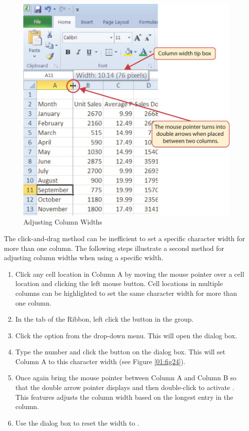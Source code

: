 \begin{figure}[H]
	\centering
	\includegraphics[width=\maxwidth{.95\linewidth}]{gfx/ch01_fig23}
	\caption{Adjusting Column Widths}
	\label{01:fig23}
\end{figure}

The click-and-drag method can be inefficient to set a specific character width for more than one column. The following steps illustrate a second method for adjusting column widths when using a specific width.

\begin{enumerate}
	\item Click any cell location in Column A by moving the mouse pointer over a cell location and clicking the left mouse button. Cell locations in multiple columns can be highlighted to set the same character width for more than one column.
	\item In the  tab of the Ribbon, left click the  button in the  group.
	\item Click the  option from the drop-down menu. This will open the  dialog box.
	\item Type the number  and click the  button on the  dialog box. This will set Column A to this character width (see Figure \ref{01:fig24}).
	\item Once again bring the mouse pointer between Column A and Column B so that the double arrow pointer displays and then double-click to activate . This features adjusts the column width based on the longest entry in the column.
	\item Use the  dialog box to reset the width to .
\end{enumerate}

